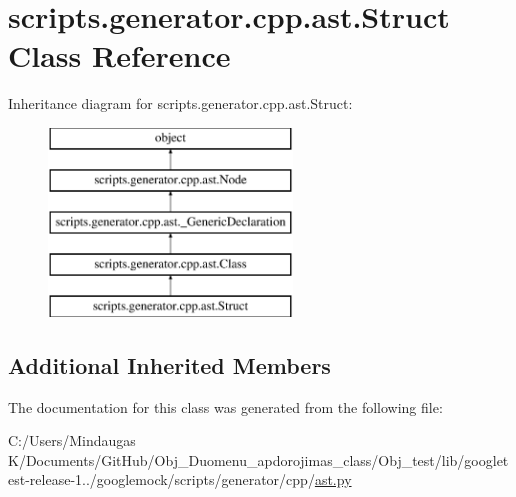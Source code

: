 \hypertarget{classscripts_1_1generator_1_1cpp_1_1ast_1_1_struct}{}\section{scripts.\+generator.\+cpp.\+ast.\+Struct Class Reference}
\label{classscripts_1_1generator_1_1cpp_1_1ast_1_1_struct}
Inheritance diagram for scripts.\+generator.\+cpp.\+ast.\+Struct\+:\begin{figure}[H]
\begin{center}
\leavevmode
\includegraphics[height=5.000000cm]{d9/df1/classscripts_1_1generator_1_1cpp_1_1ast_1_1_struct}
\end{center}
\end{figure}
\subsection*{Additional Inherited Members}


The documentation for this class was generated from the following file\+:\begin{DoxyCompactItemize}
\item 
C\+:/\+Users/\+Mindaugas K/\+Documents/\+Git\+Hub/\+Obj\+\_\+\+Duomenu\+\_\+apdorojimas\+\_\+class/\+Obj\+\_\+test/lib/googletest-\/release-\/1../googlemock/scripts/generator/cpp/\mbox{\hyperlink{_obj__test_2lib_2googletest-release-1_88_81_2googlemock_2scripts_2generator_2cpp_2ast_8py}{ast.\+py}}\end{DoxyCompactItemize}
